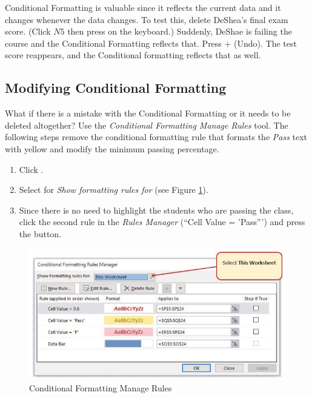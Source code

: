 Conditional Formatting is valuable since it reflects the current data and it changes whenever the data changes. To test this, delete DeShea's final exam score. (Click $ N5 $ then press  on the keyboard.) Suddenly, DeShae is failing the course and the Conditional Formatting reflects that. Press  +  (Undo). The test score reappears, and the Conditional formatting reflects that as well.

\subsection{Modifying Conditional Formatting}

What if there is a mistake with the Conditional Formatting or it needs to be deleted altogether? Use the \textit{Conditional Formatting Manage Rules} tool. The following steps remove the conditional formatting rule that formats the \textit{Pass} text with yellow and modify the minimum passing percentage.

\begin{enumbox}
	\begin{enumerate}
		\item Click . 
		\item Select  for \textit{Show formatting rules for} (see Figure \ref{03:fig23}).
		\item Since there is no need to highlight the students who are passing the class, click the second rule in the \textit{Rules Manager} (``Cell Value = 'Pass''') and press the  button.
	\end{enumerate}
\end{enumbox}
	
\begin{figure}[H]
	\centering
	\includegraphics[width=\maxwidth{.95\linewidth}]{gfx/ch03_fig23}
	\caption{Conditional Formatting Manage Rules}
	\label{03:fig23}
\end{figure}


